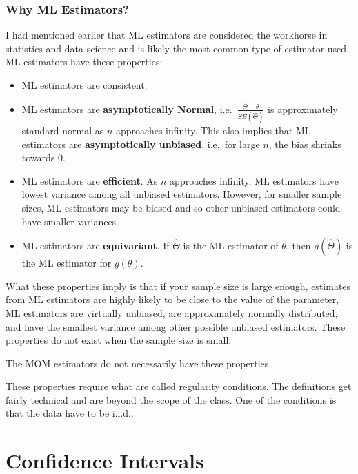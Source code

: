 \documentclass[
]{book}
\providecommand{\tightlist}{%
  \setlength{\itemsep}{0pt}\setlength{\parskip}{0pt}}
\begin{document}
\hypertarget{why-ml-estimators}{%
\subsection{Why ML Estimators?}\label{why-ml-estimators}}

I had mentioned earlier that ML estimators are considered the workhorse in statistics and data science and is likely the most common type of estimator used. ML estimators have these properties:

\begin{itemize}
\tightlist
\item
  ML estimators are consistent.
\item
  ML estimators are \textbf{asymptotically Normal}, i.e.~\(\frac{\hat{\Theta} - \theta}{SE(\hat{\Theta})}\) is approximately standard normal as \(n\) approaches infinity. This also implies that ML estimators are \textbf{asymptotically unbiased}, i.e.~for large \(n\), the bias shrinks towards 0.
\item
  ML estimators are \textbf{efficient}. As \(n\) approaches infinity, ML estimators have lowest variance among all unbiased estimators. However, for smaller sample sizes, ML estimators may be biased and so other unbiased estimators could have smaller variances.
\item
  ML estimators are \textbf{equivariant}. If \(\hat{\Theta}\) is the ML estimator of \(\theta\), then \(g(\hat{\Theta})\) is the ML estimator for \(g(\theta)\).
\end{itemize}

What these properties imply is that if your sample size is large enough, estimates from ML estimators are highly likely to be close to the value of the parameter, ML estimators are virtually unbiased, are approximately normally distributed, and have the smallest variance among other possible unbiased estimators. These properties do not exist when the sample size is small.

The MOM estimators do not necessarily have these properties.

These properties require what are called regularity conditions. The definitions get fairly technical and are beyond the scope of the class. One of the conditions is that the data have to be i.i.d..

\hypertarget{confidence-intervals}{%
\chapter{Confidence Intervals}\label{confidence-intervals}}
\end{document}
